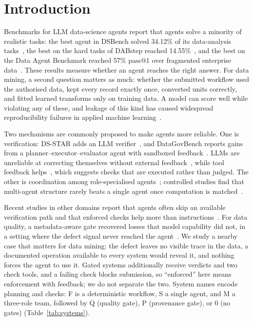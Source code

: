 \documentclass[conference]{IEEEtran}
\newcommand{\sys}[1]{\textsf{#1}}
\begin{document}
\section{Introduction}
Benchmarks for LLM data-science agents report that agents solve a minority of realistic tasks: the best agent in
DSBench solved 34.12\% of its data-analysis tasks~\cite{jing2025dsbench}, the best on the hard tasks of DABstep
reached 14.55\%~\cite{egg2025dabstep}, and the best on the Data Agent Benchmark reached 57\% pass@1 over fragmented
enterprise data~\cite{ma2026dab}. These results measure whether an agent reaches the right answer. For data mining,
a second question matters as much: whether the submitted workflow used the authorised data, kept every record exactly
once, converted units correctly, and fitted learned transforms only on training data. A model can score well while
violating any of these, and leakage of this kind has caused widespread reproducibility failures in applied machine
learning~\cite{kapoor2023leakage}.

Two mechanisms are commonly proposed to make agents more reliable. One is verification: DS-STAR adds an LLM
verifier~\cite{nam2025dsstar}, and DataGovBench reports gains from a planner--executor--evaluator agent with
sandboxed feedback~\cite{liu2025datagovbench}. LLMs are unreliable at correcting themselves without external
feedback~\cite{huang2024selfcorrect}, while tool feedback helps~\cite{gou2024critic}, which suggests checks that are
executed rather than judged. The other is coordination among role-specialised agents~\cite{wu2023autogen,
hong2024metagpt}; controlled studies find that multi-agent structure rarely beats a single agent once computation is
matched~\cite{tran2026single,fu2026moreagents,dylan2026equalcost}.

Recent studies in other domains report that agents often skip an available verification path and that enforced
checks help more than instructions~\cite{zhang2026rite,zhang2026rethinking,sharma2026contextcov}. For data quality,
a metadata-aware gate recovered losses that model capability did not, in a setting where the defect signal never
reached the agent~\cite{besanson2026sarcdq}. We study a nearby case that matters for data mining: the defect leaves
no visible trace in the data, a documented operation available to every system would reveal it, and nothing forces
the agent to use it. Gated systems additionally receive verdicts and two check tools, and a failing check blocks
submission, so ``enforced'' here means enforcement with feedback; we do not separate the two. System names encode
planning and checks: \sys{F} is a deterministic workflow, \sys{S} a single agent, and \sys{M} a three-role team,
followed by \sys{Q} (quality gate), \sys{P} (provenance gate), or \sys{0} (no gates) (Table~\ref{tab:systems}).
\end{document}
